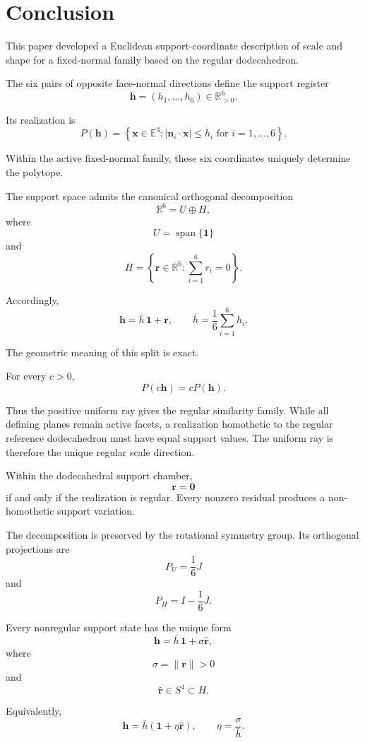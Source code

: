 \section{Conclusion}

This paper developed a Euclidean support-coordinate description of scale
and shape for a fixed-normal family based on the regular dodecahedron.

The six pairs of opposite face-normal directions define the support
register
\[
\mathbf h=(h_1,\ldots,h_6)\in\mathbb R_{>0}^6.
\]

Its realization is
\[
P(\mathbf h)
=
\left\{
\mathbf x\in\mathbb E^3:
|\mathbf n_i\cdot\mathbf x|\le h_i
\text{ for }i=1,\ldots,6
\right\}.
\]

Within the active fixed-normal family, these six coordinates uniquely
determine the polytope.

The support space admits the canonical orthogonal decomposition
\[
\mathbb R^6=U\oplus H,
\]
where
\[
U=\operatorname{span}\{\mathbf 1\}
\]
and
\[
H=
\left\{
\mathbf r\in\mathbb R^6:
\sum_{i=1}^{6}r_i=0
\right\}.
\]

Accordingly,
\[
\mathbf h
=
\bar h\,\mathbf 1+\mathbf r,
\qquad
\bar h
=
\frac{1}{6}\sum_{i=1}^{6}h_i.
\]

The geometric meaning of this split is exact.

For every \(c>0\),
\[
P(c\mathbf h)=cP(\mathbf h).
\]

Thus the positive uniform ray gives the regular similarity family. While all
defining planes remain active facets, a realization homothetic to the
regular reference dodecahedron must have equal support values. The uniform
ray is therefore the unique regular scale direction.

Within the dodecahedral support chamber,
\[
\mathbf r=\mathbf 0
\]
if and only if the realization is regular. Every nonzero residual produces
a non-homothetic support variation.

The decomposition is preserved by the rotational symmetry group. Its
orthogonal projections are
\[
P_U=\frac{1}{6}J
\]
and
\[
P_H=I-\frac{1}{6}J.
\]

Every nonregular support state has the unique form
\[
\mathbf h
=
\bar h\,\mathbf 1
+
\sigma\widehat{\mathbf r},
\]
where
\[
\sigma=\|\mathbf r\|>0
\]
and
\[
\widehat{\mathbf r}\in S^4\subset H.
\]

Equivalently,
\[
\mathbf h
=
\bar h
\left(
\mathbf 1+\eta\widehat{\mathbf r}
\right),
\qquad
\eta=\frac{\sigma}{\bar h}.
\]

